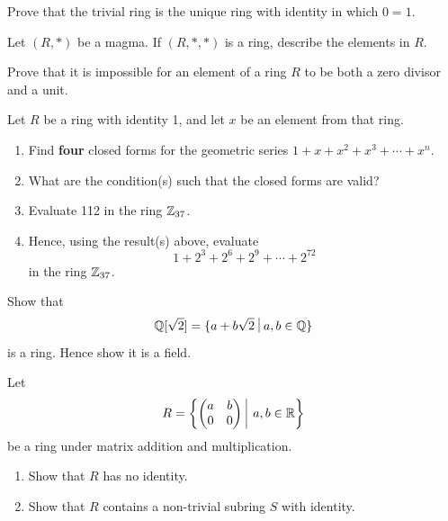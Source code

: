 \begin{problem}
    Prove that the trivial ring is the unique ring with identity in which $0 = 1$.
\end{problem}

\begin{problem}
    Let $(R, \ast)$ be a magma. If $(R, \ast, \ast)$ is a ring, describe the elements in $R$.
\end{problem}

\begin{problem}
    Prove that it is impossible for an element of a ring $R$ to be both a zero divisor and a unit.
\end{problem}

\begin{problem}
    Let $R$ be a ring with identity 1, and let $x$ be an element from that ring.
    \begin{enumerate}[label=(\roman*)]
        \item Find \textbf{four} closed forms for the geometric series $1 + x + x^2 + x^3 + \cdots + x^n$.
        \item What are the condition(s) such that the closed forms are valid?
        \item Evaluate 112 in the ring $\mathbb{Z}_{37}$.
        \item Hence, using the result(s) above, evaluate
        \[
            1 + 2^3 + 2^6 + 2^9 + \cdots + 2^{72}
        \]
        in the ring $\mathbb{Z}_{37}$.
    \end{enumerate}
\end{problem}

\begin{problem}
    Show that
    \[
        \Q[\sqrt2] = \{a + b\sqrt2 \vert a,b \in \Q\}
    \]
    is a ring. Hence show it is a field.
\end{problem}

\newpage

\begin{problem}
    Let
    \[
        R = \left\{\begin{pmatrix}a&b\\0&0\end{pmatrix} \vert a,b \in \R\right\}    
    \]
    be a ring under matrix addition and multiplication.
    \begin{enumerate}[label=(\roman*)]
        \item Show that $R$ has no identity.
        \item Show that $R$ contains a non-trivial subring $S$ with identity.
    \end{enumerate}
\end{problem}

